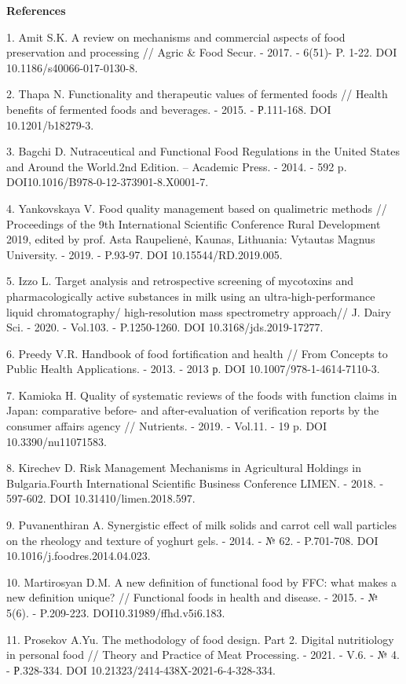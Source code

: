 {\bfseries References}

1. Amit S.K. A review on mechanisms and commercial aspects of food
preservation and processing // Agric \& Food Secur. - 2017. - 6(51)- P.
1-22. DOI 10.1186/s40066-017-0130-8.

2. Thapa N. Functionality and therapeutic values of fermented foods //
Health benefits of fermented foods and beverages. - 2015. - Р.111-168.
DOI 10.1201/b18279-3.

3. Bagchi D. Nutraceutical and Functional Food Regulations in the United
States and Around the World.2nd Edition. -- Academic Press. - 2014. -
592 p. DOI10.1016/B978-0-12-373901-8.X0001-7.

4. Yankovskaya V. Food quality management based on qualimetric methods
// Proceedings of the 9th International Scientific Conference Rural
Development 2019, edited by prof. Asta Raupelienė, Kaunas, Lithuania:
Vytautas Magnus University. - 2019. - P.93-97. DOI
10.15544/RD.2019.005.

5. Izzo L. Target analysis and retrospective screening of mycotoxins and
pharmacologically active substances in milk using an
ultra-high-performance liquid chromatography/ high-resolution mass
spectrometry approach// J. Dairy Sci. - 2020. - Vol.103. - P.1250-1260.
DOI 10.3168/jds.2019-17277.

6. Preedy V.R. Handbook of food fortification and health // From
Concepts to Public Health Applications. - 2013. - 2013 р. DOI
10.1007/978-1-4614-7110-3.

7. Kamioka H. Quality of systematic reviews of the foods with function
claims in Japan: comparative before- and after-evaluation of
verification reports by the consumer affairs agency // Nutrients. -
2019. - Vol.11. - 19 p. DOI 10.3390/nu11071583.

8. Kirechev D. Risk Management Mechanisms in Agricultural Holdings in
Bulgaria.Fourth International Scientific Business Conference LIMEN. -
2018. - 597-602. DOI 10.31410/limen.2018.597.

9. Puvanenthiran A. Synergistic effect of milk solids and carrot cell
wall particles on the rheology and texture of yoghurt gels. - 2014. - №
62. - P.701-708. DOI 10.1016/j.foodres.2014.04.023.

10. Martirosyan D.M. A new definition of functional food by FFC: what
makes a new definition unique? // Functional foods in health and
disease. - 2015. - № 5(6). - P.209-223. DOI10.31989/ffhd.v5i6.183.

11. Prosekov A.Yu. The methodology of food design. Part 2. Digital
nutritiology in personal food // Theory and Practice of Meat Processing.
- 2021. - V.6. - № 4. - Р.328-334. DOI
10.21323/2414-438X-2021-6-4-328-334.

